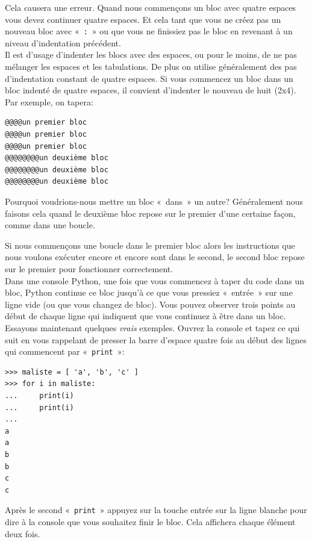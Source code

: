 Cela causera une erreur. Quand nous commençons un bloc avec quatre espaces vous devez continuer quatre espaces. Et cela tant que vous ne créez pas un nouveau bloc avec «~\verb+:+~» ou que vous ne finissiez pas le bloc en revenant à un niveau d'indentation précédent.\\

Il est d'usage d'indenter les blocs avec des espaces, ou pour le moins, de ne pas mélanger les espaces et les tabulations. De plus on utilise généralement des pas d'indentation constant de quatre espaces.
Si vous commencez un bloc dans un bloc indenté de quatre espaces, il convient d'indenter le nouveau de huit (2x4).
Par exemple, on tapera:

\begin{Verbatim}[frame=single,rulecolor=\color{gray}, label=ne pas saisir]
@@@@un premier bloc
@@@@un premier bloc
@@@@un premier bloc
@@@@@@@@un deuxième bloc
@@@@@@@@un deuxième bloc
@@@@@@@@un deuxième bloc
\end{Verbatim}

Pourquoi voudrions-nous mettre un bloc «~dans~» un autre? Généralement nous faisons cela quand le deuxième bloc repose sur le premier d'une certaine façon, comme dans une boucle.

Si nous commençons une boucle dans le premier bloc alors les instructions que nous voulons exécuter encore et encore sont dans le second, le second bloc repose sur le premier pour fonctionner correctement.\\

Dans une console Python, une fois que vous commencez à taper du code dans un bloc, Python continue ce bloc jusqu'à ce que vous pressiez «~entrée~» sur une ligne vide (ou que vous changez de bloc). Vous pouvez observer trois points au début de chaque ligne qui indiquent que vous continuez à être dans un bloc.\\

Essayons maintenant quelques \emph{vrais} exemples. Ouvrez la console et tapez ce qui suit en vous rappelant de presser la barre d'espace quatre fois au début des lignes qui commencent par «~\texttt{print}~»:

\begin{Verbatim}[frame=single,rulecolor=\color{green}, label=à saisir avec attention]
>>> maliste = [ 'a', 'b', 'c' ]
>>> for i in maliste:
...     print(i)
...     print(i)
...
a
a
b
b
c
c
\end{Verbatim} 

Après le second «~\texttt{print}~» appuyez sur la touche entrée sur la ligne blanche pour dire à la console que vous souhaitez finir le bloc. Cela affichera chaque élément deux fois.\\


